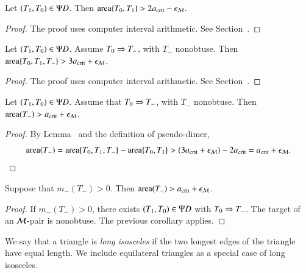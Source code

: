 \begin{lemma}
Let $(T_1,T_0)\in\Psi D$.  Then ${\operatorname{area}}\{T_0,T_1\} > 2a_\text{crit} - \epsilon_{\mathcal M}$.
\end{lemma}

\begin{proof} The proof uses computer interval arithmetic. See Section~.
\end{proof}

\begin{lemma}
Let $(T_1,T_0)\in\Psi D$. Assume $T_0\Rightarrow T_-$, with $T_-$ nonobtuse.
Then ${\operatorname{area}}\{T_0,T_1,T_-\} > 3a_\text{crit} + \epsilon_{\mathcal M}$.
\end{lemma}

\begin{proof} The proof uses computer interval arithmetic. See Section~.
\end{proof}

\begin{corollary} 
Let $(T_1,T_0)\in\Psi D$.  Assume that $T_0\Rightarrow T_-$, with $T_-$ nonobtuse.  Then
${\operatorname{area}}(T_-) > a_\text{crit}+\epsilon_{\mathcal M}$.
\end{corollary}

\begin{proof}  
  By Lemma~ and the definition of pseudo-dimer,
\[
{\operatorname{area}}(T_-) = {\operatorname{area}}\{T_0,T_1,T_-\} - {\operatorname{area}}\{T_0,T_1\} 
> (3a_\text{crit} + \epsilon_{\mathcal M}) - 2a_\text{crit} = a_\text{crit} + \epsilon_{\mathcal M}.
\]
\end{proof}

\begin{corollary}
  Suppose that $m_-(T_-)>0$.  Then ${\operatorname{area}}(T_-) > a_\text{crit} + \epsilon_{\mathcal M}$.
\end{corollary}

\begin{proof} 
  If $m_-(T_-)>0$, there exists $(T_1,T_0)\in\Psi D$ with $T_0\Rightarrow T_-$.
  The target of an $\mathcal M$-pair is nonobtuse. The previous corollary applies.
\end{proof}

\begin{definition}
  We say that a triangle is {\it long isosceles} if the two longest edges of
  the triangle have equal length.  We include equilateral triangles as
  a special case of long isosceles.
\end{definition}

